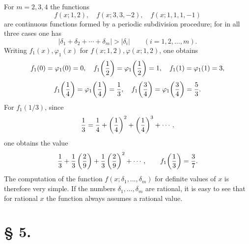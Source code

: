 For $m=2,3,4$ the functions
\[
 f(x;1,2),\quad f(x;3,3,-2),\quad f(x;1,1,1,-1)
\]
are continuous functions formed by a periodic subdivision procedure; for in all three cases one has
\[
 |\delta_1+\delta_2+\cdots+\delta_m|>|\delta_i|
 \qquad (i=1,2,\ldots,m).
\]
Writing $f_1(x),\varphi_1(x)$ for $f(x;1,2),\varphi(x;1,2)$, one obtains
\[
 f_1(0)=\varphi_1(0)=0,
 \quad
 f_1\!\left({1\over2}\right)=\varphi_1\!\left({1\over2}\right)=1,
 \quad
 f_1(1)=\varphi_1(1)=3,
\]
\[
 f_1\!\left({1\over4}\right)=\varphi_1\!\left({1\over4}\right)={1\over3},
 \quad
 f_1\!\left({3\over4}\right)=\varphi_1\!\left({3\over4}\right)={5\over3}.
\]
For $f_1(1/3)$, since
\[
 {1\over3}={1\over4}+\left({1\over4}\right)^2+\left({1\over4}\right)^3+\cdots,
\]
one obtains the value
\[
 {1\over3}+{1\over3}\left({2\over9}\right)+{1\over3}\left({2\over9}\right)^2+\cdots,
 \qquad
 f_1\!\left({1\over3}\right)={3\over7}.
\]
The computation of the function $f(x;\delta_1,\ldots,\delta_m)$ for definite values of $x$ is therefore very simple. If the numbers $\delta_1,\ldots,\delta_m$ are rational, it is easy to see that for rational $x$ the function always assumes a rational value.

\section*{§ 5.}

